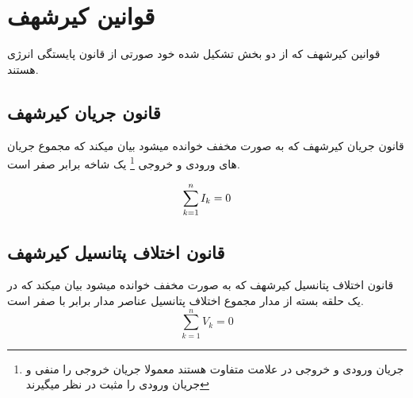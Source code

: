 \section{قوانین کیرشهف}
قوانین کیرشهف که از دو بخش تشکیل شده خود صورتی از قانون پایستگی انرژی هستند.
\subsection{قانون جریان کیرشهف}
قانون جریان کیرشهف که به صورت مخفف
خوانده میشود بیان میکند که مجموع جریان های ورودی و خروجی
\footnote{	جریان ورودی و خروجی در علامت متفاوت هستند معمولا جریان خروجی را منفی و جریان ورودی را مثبت در نظر میگیرند	}
 یک شاخه برابر صفر است.
 
\begin{equation}\label{eq:kcl}
	\sum_{k=1}^{n}I_k\index{k} = 0
\end{equation}
\subsection{قانون اختلاف پتانسیل کیرشهف}
قانون اختلاف پتانسیل کیرشهف که به صورت مخفف
خوانده میشود بیان میکند که در یک حلقه بسته از مدار مجموع اختلاف پتانسیل عناصر مدار برابر با صفر است.
\begin{equation}\label{eq:kvl}
	\sum_{k=1}^{n}V_k = 0
\end{equation}
